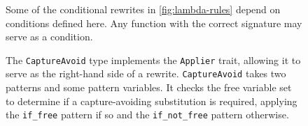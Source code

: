 \begin{figure}
{Some of the conditional rewrites in \autoref{fig:lambda-rules} depend on
  conditions defined here.
Any function with the correct signature may serve as a condition.

The \texttt{CaptureAvoid} type implements the \texttt{Applier} trait, allowing
  it to serve as the right-hand side of a rewrite.
\texttt{CaptureAvoid} takes two patterns and some pattern variables.
It checks the free variable set to determine if a capture-avoiding substitution
  is required, applying the \texttt{if\_free} pattern if so and the
  \texttt{if\_not\_free} pattern otherwise.
}
\label{fig:lambda-applier}
\label{fig:lambda-analysis}
\end{figure}

